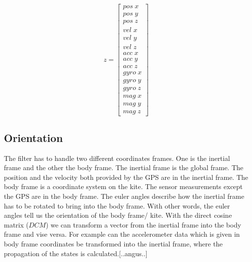 \begin{equation}
 z= \begin{bmatrix}
  pos\;x \\
  pos\;y \\
  pos\;z \\
  vel\;x \\
  vel\;y \\
  vel\;z \\
  acc\;x \\
  acc\;y \\
  acc\;z \\
  gyro\;x \\
  gyro\;y \\
  gyro\;z \\
  mag\;x \\
  mag\;y \\
  mag\;z
 \end{bmatrix}
\end{equation}

\subsection*{Orientation}
The filter has to handle two different coordinates frames. One is the inertial frame and the other the body frame. The inertial frame is the global frame. The position and the velocity both provided by the GPS are in the inertial frame. The body frame is a coordinate system on the kite. The sensor measurements except the GPS are in the body frame.
The euler angles describe how the inertial frame has to be rotated to bring into the body frame. With other words, the euler angles tell us the orientation of the body frame/ kite. With the direct cosine matrix ($DCM$) we can transform a vector from the inertial frame into the body frame and vise versa. For example can the accelerometer data which is given in body frame coordinates be transformed into the inertial frame, where the propagation of the states is calculated.[..angus..]

